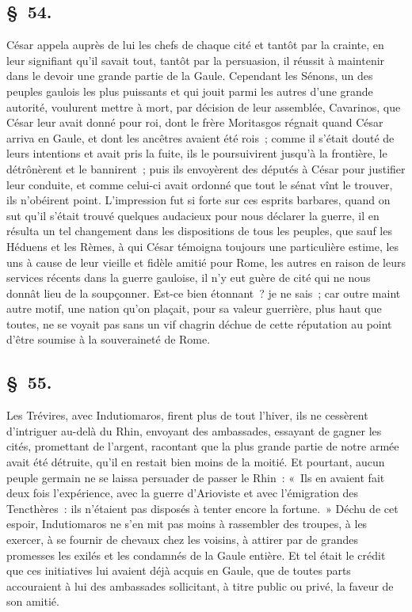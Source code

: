 \documentclass[french,twoside]{book} %
\begin{document}
\subsection[{§ 54.}]{ \textsc{§ 54.} }
\noindent César appela auprès de lui les chefs de chaque cité et tantôt par la crainte, en leur signifiant qu’il savait tout, tantôt par la persuasion, il réussit à maintenir dans le devoir une grande partie de la Gaule. Cependant les Sénons, un des peuples gaulois les plus puissants et qui jouit parmi les autres d’une grande autorité, voulurent mettre à mort, par décision de leur assemblée, Cavarinos, que César leur avait donné pour roi, dont le frère Moritasgos régnait quand César arriva en Gaule, et dont les ancêtres avaient été rois ; comme il s’était douté de leurs intentions et avait pris la fuite, ils le poursuivirent jusqu’à la frontière, le détrônèrent et le bannirent ; puis ils envoyèrent des députés à César pour justifier leur conduite, et comme celui-ci avait ordonné que tout le sénat vînt le trouver, ils n’obéirent point. L'impression fut si forte sur ces esprits barbares, quand on sut qu’il s’était trouvé quelques audacieux pour nous déclarer la guerre, il en résulta un tel changement dans les dispositions de tous les peuples, que sauf les Héduens et les Rèmes, à qui César témoigna toujours une particulière estime, les uns à cause de leur vieille et fidèle amitié pour Rome, les autres en raison de leurs services récents dans la guerre gauloise, il n’y eut guère de cité qui ne nous donnât lieu de la soupçonner. Est-ce bien étonnant ? je ne sais ; car outre maint autre motif, une nation qu’on plaçait, pour sa valeur guerrière, plus haut que toutes, ne se voyait pas sans un vif chagrin déchue de cette réputation au point d’être soumise à la souveraineté de Rome.
\subsection[{§ 55.}]{ \textsc{§ 55.} }
\noindent Les Trévires, avec Indutiomaros, firent plus de tout l’hiver, ils ne cessèrent d’intriguer au-delà du Rhin, envoyant des ambassades, essayant de gagner les cités, promettant de l’argent, racontant que la plus grande partie de notre armée avait été détruite, qu’il en restait bien moins de la moitié. Et pourtant, aucun peuple germain ne se laissa persuader de passer le Rhin : « Ils en avaient fait deux fois l’expérience, avec la guerre d’Arioviste et avec l’émigration des Tencthères : ils n’étaient pas disposés à tenter encore la fortune. » Déchu de cet espoir, Indutiomaros ne s’en mit pas moins à rassembler des troupes, à les exercer, à se fournir de chevaux chez les voisins, à attirer par de grandes promesses les exilés et les condamnés de la Gaule entière. Et tel était le crédit que ces initiatives lui avaient déjà acquis en Gaule, que de toutes parts accouraient à lui des ambassades sollicitant, à titre public ou privé, la faveur de son amitié.
\end{document}
